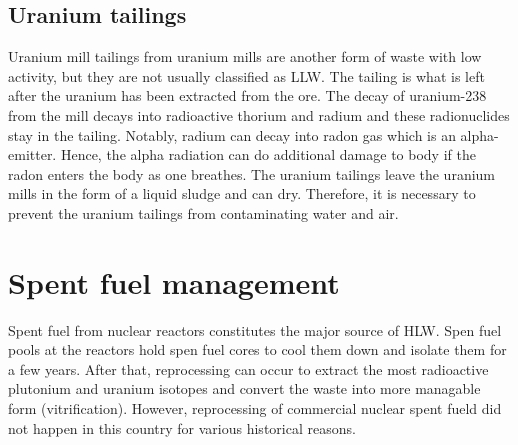 \documentclass[preprint,aip,pra]{revtex4-1}
\begin{document}
    \subsection{Uranium tailings}
    Uranium mill tailings from uranium mills are another form of waste with low activity, but
    they are not usually classified as LLW. The tailing is what is left after the uranium has been
    extracted from the ore. The decay of uranium-238 from the mill decays into
    radioactive thorium and radium and these radionuclides stay in the tailing. Notably, radium
    can decay into radon gas which is an alpha-emitter. Hence, the alpha radiation can do additional
    damage to body if the radon enters the body as one breathes.
    The uranium tailings leave the uranium mills in the form of a liquid sludge
    and can dry. Therefore, it is necessary to prevent the uranium tailings
    from contaminating water and air.
    
    \section{Spent fuel management}
    Spent fuel from nuclear reactors constitutes the major source of HLW. Spen fuel pools at the
    reactors hold spen fuel cores to cool them down and isolate them for a few years. After that,
    reprocessing can occur to extract the most radioactive plutonium and uranium isotopes and
    convert the waste into more managable form (vitrification). However, reprocessing of commercial
    nuclear spent fueld did not
    happen in this country for various historical reasons. 
\end{document}

